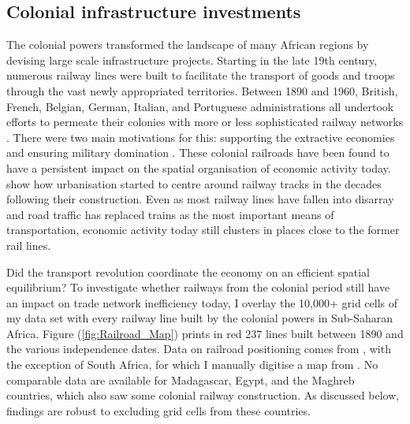 \documentclass[11pt, oneside]{article}   	%
\let\oldref\ref
\renewcommand{\ref}[1]{(\oldref{#1})}
\begin{document}
\subsection{Colonial infrastructure investments}

The colonial powers transformed the landscape of many African regions by devising large scale infrastructure projects. Starting in the late 19th century, numerous railway lines were built to facilitate the transport of goods and troops through the vast newly appropriated territories. Between 1890 and 1960, British, French, Belgian, German, Italian, and Portuguese administrations all undertook efforts to permeate their colonies with more or less sophisticated railway networks \citep{Jedwab_PermanentEffectsTransportation_2016a}. There were two main motivations for this: supporting the extractive economies and ensuring military domination \citep{Jedwab_HistoryPathDependence_2017a}. These colonial railroads have been found to have a persistent impact on the spatial organisation of economic activity today. \cite{Jedwab_PermanentEffectsTransportation_2016a} show how urbanisation started to centre around railway tracks in the decades following their construction. Even as most railway lines have fallen into disarray and road traffic has replaced trains as the most important means of transportation, economic activity today still clusters in places close to the former rail lines.

Did the transport revolution coordinate the economy on an efficient spatial equilibrium? To investigate whether railways from the colonial period still have an impact on trade network inefficiency today, I overlay the 10,000+ grid cells of my data set with every railway line built by the colonial powers in Sub-Saharan Africa. Figure \ref{fig:Railroad_Map} prints in red 237 lines built between 1890 and the various independence dates. Data on railroad positioning comes from \cite{Jedwab_PermanentEffectsTransportation_2016a}, with the exception of South Africa, for which I manually digitise a map from \cite{Herranz-Loncan_publicbenefitRailways_2017}. No comparable data are available for Madagascar, Egypt, and the Maghreb countries, which also saw some colonial railway construction. As discussed below, findings are robust to excluding grid cells from these countries.
\end{document}
